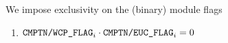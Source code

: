 \begin{center}
\end{center}
We impose exclusivity on the (binary) module flags
\begin{enumerate}
	\item $\texttt{CMPTN}\texttt{/}{\texttt{WCP\_FLAG}} _{i} \cdot \texttt{CMPTN}\texttt{/}{\texttt{EUC\_FLAG}} _{i} = 0$
\end{enumerate}
